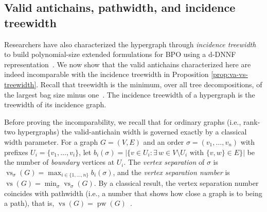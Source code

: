 



\subsection{Valid antichains, pathwidth,  and incidence treewidth}
\label{subsec:vaw_treewidth_relation}

Researchers have also characterized the hypergraph through \emph{incidence treewidth} to build polynomial-size extended formulations for BPO using a d-DNNF representation~\cite{capelliDelPiaDiGregorio2024kc}. We now show that the valid antichains characterized here are indeed incomparable with the incidence treewidth in Proposition \ref{prop:va-vs-treewidth}. Recall that treewidth is the minimum, over all tree decompositions, of the largest bag size minus one~\cite{diestel2017graph}. The incidence treewidth of a hypergraph is the treewidth of its incidence graph.

Before proving the incomparability, we recall that for ordinary graphs (i.e., rank-two hypergraphs) the valid-antichain width is governed exactly by a classical width parameter. For a graph $G=(V,E)$ and an order $\sigma=(v_1,\ldots,v_n)$ with prefixes $U_i=\{v_1,\ldots,v_i\}$, let $b_i(\sigma)=\left|\{v\in U_i : \exists\, w\in V\setminus U_i \text{ with } \{v,w\}\in E\}\right|$ be the number of \emph{boundary} vertices at $U_i$. The \emph{vertex separation} of $\sigma$ is $\operatorname{vs}_\sigma(G)=\max_{i\in\{1,\ldots,n\}} b_i(\sigma)$, and the \emph{vertex separation number} is $\operatorname{vs}(G)=\min_\sigma \operatorname{vs}_\sigma(G)$. By a classical result, the vertex separation number coincides with pathwidth (i.e., a number that shows how close a graph is to being a path), that is, $\operatorname{vs}(G)=\operatorname{pw}(G)$~\cite{kinnersley1992pathwidth}.

